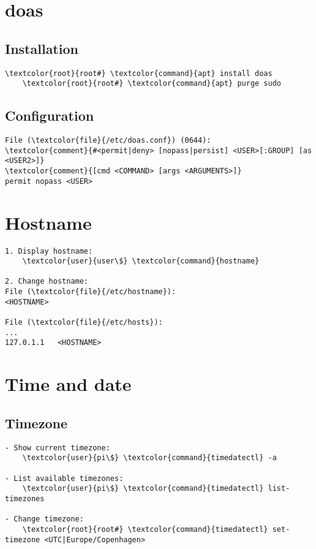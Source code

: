\documentclass[10pt, a4paper, onecolumn, openany]{book} %
\begin{document}
\section{doas}
\subsection{Installation}
\begin{Verbatim}[commandchars=\\\{\}]
    \textcolor{root}{root#} \textcolor{command}{apt} install doas
    \textcolor{root}{root#} \textcolor{command}{apt} purge sudo
\end{Verbatim}
\subsection{Configuration}
\begin{Verbatim}[commandchars=\\\{\}]
File (\textcolor{file}{/etc/doas.conf}) (0644):
\textcolor{comment}{#<permit|deny> [nopass|persist] <USER>[:GROUP] [as <USER2>]}
\textcolor{comment}{[cmd <COMMAND> [args <ARGUMENTS>]}
permit nopass <USER>
\end{Verbatim}

\section{Hostname}
\begin{Verbatim}[commandchars=\\\{\}]
1. Display hostname:
    \textcolor{user}{user\$} \textcolor{command}{hostname}
    
2. Change hostname:
File (\textcolor{file}{/etc/hostname}):
<HOSTNAME>

File (\textcolor{file}{/etc/hosts}):
...
127.0.1.1   <HOSTNAME>
\end{Verbatim}

\section{Time and date}
\subsection{Timezone}
\begin{Verbatim}[commandchars=\\\{\}]
- Show current timezone:
    \textcolor{user}{pi\$} \textcolor{command}{timedatectl} -a

- List available timezones:
    \textcolor{user}{pi\$} \textcolor{command}{timedatectl} list-timezones
    
- Change timezone:
    \textcolor{root}{root#} \textcolor{command}{timedatectl} set-timezone <UTC|Europe/Copenhagen>
\end{Verbatim}
\end{document}
